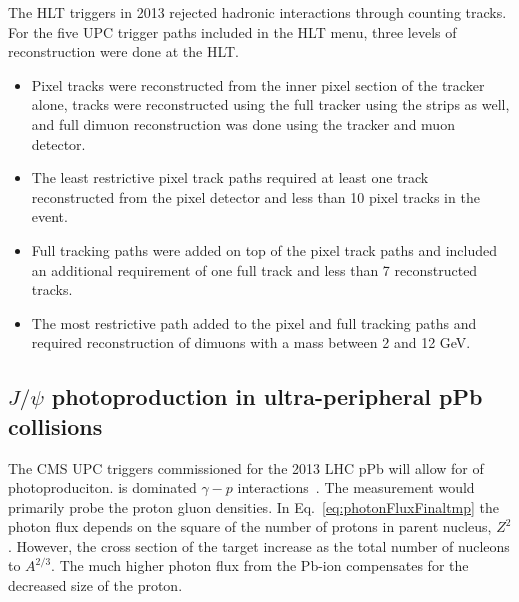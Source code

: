     The HLT triggers in 2013 rejected hadronic interactions through counting
      tracks. 
    For the five UPC trigger paths included in the HLT menu, 
      three levels of reconstruction were done at the HLT.

    \begin{itemize}
      \item Pixel tracks were reconstructed from the inner pixel section of the 
        \DIFdelbegin {}\DIFdelend \DIFaddbegin {}\DIFaddend tracker alone, tracks were reconstructed using the full
        tracker using the strips as well, and full dimuon reconstruction was 
        done using the tracker and muon detector. 
      \item The least restrictive pixel track paths required at least 
        one track reconstructed from the pixel detector and less than 10 pixel 
        tracks in the event.
      \item Full tracking paths were added on top of the pixel track paths and included
        an additional requirement of one full track and less than 7 reconstructed
        tracks.
      \item The most restrictive path added to the pixel and full tracking paths and 
        required reconstruction of dimuons with a mass between 2 and 12 GeV.
    \end{itemize}

    \subsection{$J/\psi$ photoproduction in ultra-peripheral pPb collisions}
      The CMS UPC triggers commissioned for the 2013 LHC pPb \DIFaddbegin {}\DIFaddend will allow for
        \DIFdelbegin {}\DIFdelend \DIFaddbegin {}\DIFaddend of \JPsi{} photoproduciton.
      \DIFdelbegin {}\DIFdelend \DIFaddbegin {}\JPsi{} \DIFaddend is dominated 
        $\gamma-p$ interactions~\cite{Frankfurt:2006tp,Guzey:2013taa}.
      The measurement would primarily probe the proton gluon densities.
      In Eq.~\ref{eq:photonFluxFinaltmp} the photon flux depends on the square
        of the number of protons in \DIFaddbegin {}\DIFaddend parent nucleus, $Z^{2}$. 
      However, the cross section of the target \DIFdelbegin {}\DIFdelend increase as the total 
        number of nucleons to \DIFaddbegin {}\DIFaddend $A^{2/3}$.
      The much higher photon flux from the Pb-ion compensates for 
        the decreased size of the proton.

